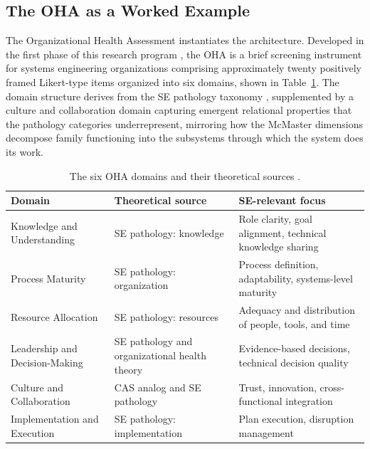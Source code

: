 \documentclass[12pt, letterpaper]{article}
\begin{document}
\subsection{The OHA as a Worked Example}
\label{sec:oha-application}

The Organizational Health Assessment instantiates the architecture. Developed in the first phase of this research program \parencite{carr2025}, the OHA is a brief screening instrument for systems engineering organizations comprising approximately twenty positively framed Likert-type items organized into six domains, shown in Table~\ref{tab:oha-domains}. The domain structure derives from the SE pathology taxonomy \parencite{davidz2018}, supplemented by a culture and collaboration domain capturing emergent relational properties that the pathology categories underrepresent, mirroring how the McMaster dimensions decompose family functioning into the subsystems through which the system does its work.

\begin{table}[htbp]
\centering
\small
\caption{The six OHA domains and their theoretical sources \parencite{carr2025,davidz2018}.}
\label{tab:oha-domains}
\begin{tabular}{p{4.2cm}p{3.8cm}p{5.4cm}}
\toprule
Domain & Theoretical source & SE-relevant focus \\
\midrule
Knowledge and Understanding & SE pathology: knowledge & Role clarity, goal alignment, technical knowledge sharing \\
\midrule
Process Maturity & SE pathology: organization & Process definition, adaptability, systems-level maturity \\
\midrule
Resource Allocation & SE pathology: resources & Adequacy and distribution of people, tools, and time \\
\midrule
Leadership and Decision-Making & SE pathology and organizational health theory & Evidence-based decisions, technical decision quality \\
\midrule
Culture and Collaboration & CAS analog and SE pathology & Trust, innovation, cross-functional integration \\
\midrule
Implementation and Execution & SE pathology: implementation & Plan execution, disruption management \\
\bottomrule
\end{tabular}
\end{table}
\end{document}
